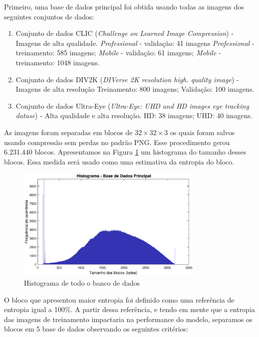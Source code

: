 Primeiro, uma base de dados principal foi obtida usando todas as imagens dos seguintes conjuntos de dados:

\begin{enumerate}
	\item Conjunto de dados CLIC \cite{bib:clic} (\textit{Challenge on Learned Image Compression}) - Imagens de alta qualidade.
	\subitem \textit{Professional} - validação: 41 imagens
	\subitem \textit{Professional} - treinamento: 585 imagens;
	\subitem \textit{Mobile} - validação: 61 imagens;
	\subitem \textit{Mobile} - treinamento: 1048 imagens.
	\item Conjunto de dados DIV2K \cite{bib:div2k} (\textit{DIVerse 2K resolution high.
		quality image}) - Imagens de alta resolução
	\subitem Treinamento: 800 imagens;
	\subitem Validação: 100 imagens.
	\item Conjunto de dados Ultra-Eye \cite{bib:ultraeye} (\textit{Ultra-Eye: UHD and HD images eye tracking datase}) - Alta qualidade e alta resolução.
	\subitem HD: 38 imagens;
	\subitem UHD: 40 imagens.
\end{enumerate}

As imagens foram separadas em blocos de $32 \times 32 \times 3$ os quais foram salvos usando compressão sem perdas no padrão PNG. Esse procedimento gerou 6.231.440 blocos.
Apresentamos na Figura \ref{fig:histdatabase} um histograma do tamanho desses blocos. Essa medida será usado como uma estimativa da entropia do bloco.

\begin{figure}[htbp]
	\centering
	\includegraphics[width=0.80\textwidth]{figuras/hist.eps}
	\caption{Histograma de todo o banco de dados}
	\label{fig:histdatabase}
\end{figure}

O bloco que apresentou maior entropia foi definido como uma referência de entropia igual a 100\%. 
A partir dessa referência, e tendo em mente que a entropia das imagens de treinamento impactaria na performance do modelo, separamos os blocos em 5 base de dados observando os seguintes critérios:

